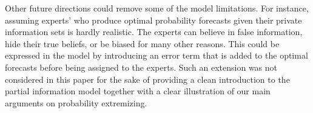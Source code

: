 \documentclass[11pt]{article}
\theoremstyle{definition}
\theoremstyle{definition}
\begin{document}
 
 Other future directions could  remove some of the model limitations. For instance, assuming experts' who produce optimal probability forecasts given their private information sets is hardly realistic. The experts can believe in false information, hide their true beliefs, or be biased for many other reasons. This could be expressed in the model by introducing an error term that is added to the optimal forecasts before being assigned to the experts. Such an extension was not considered in this paper for the sake of providing a clean introduction to the partial information model together with a clear illustration of our main arguments on  probability extremizing. 
 
 
% 

 
 
 


%

\end{document}
